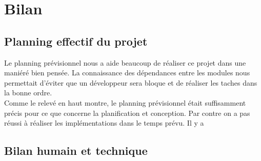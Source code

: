 \documentclass[10pt,a4paper]{book}
\begin{document}
\chapter{Bilan}
\section{Planning effectif du projet}
Le planning prévisionnel nous a aide beaucoup de réaliser ce projet dans une maniéré bien pensée. La connaissance des dépendances entre les modules nous permettait d'éviter que un développeur sera bloque et de réaliser les taches dans la bonne ordre.\\
Comme le relevé en haut montre, le planning prévisionnel était suffisamment précis pour ce que concerne la planification et conception. Par contre on a pas réussi à réaliser les implémentations dans le temps prévu. Il y a 
\section{Bilan humain et technique}
\end{document}
